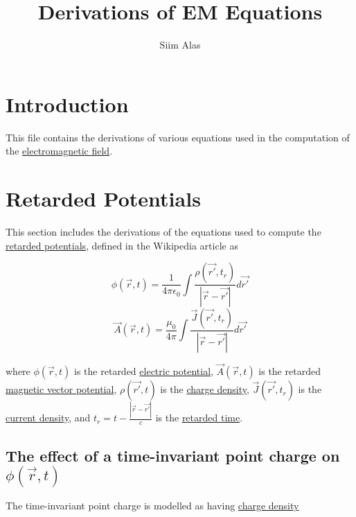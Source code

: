 ﻿\documentclass{article}
\title{Derivations of EM Equations}
\author{Siim Alas}
\begin{document}
\maketitle

\section*{Introduction}

This file contains the derivations of various equations used in the computation of the \href{https://en.wikipedia.org/wiki/Electromagnetic_field}{electromagnetic field}.

\section{Retarded Potentials}

This section includes the derivations of the equations used to compute the \href{https://en.wikipedia.org/wiki/Retarded_potential}{retarded potentials}, defined in the Wikipedia article as

\begin{equation}
    \label{eq:definitionOfPhi}
    \phi(\vec{r}, t) = \frac{1}{4 \pi \epsilon_0} \int \frac{\rho(\vec{r'}, t_r)}{|\vec{r} - \vec{r'}|} d \vec{r'}
\end{equation}
\begin{equation}
    \label{eq:definitionOfA}
    \vec{A}(\vec{r}, t) = \frac{\mu_0}{4 \pi} \int \frac{\vec{J}(\vec{r'}, t_r)}{|\vec{r} - \vec{r'}|} d \vec{r'}
\end{equation}

where $\phi(\vec{r}, t)$ is the retarded \href{https://en.wikipedia.org/wiki/Electric_potential}{electric potential}, $\vec{A}(\vec{r}, t)$ is the retarded \href{https://en.wikipedia.org/wiki/Magnetic_vector_potential}{magnetic vector potential}, $\rho(\vec{r'}, t)$ is the \href{https://en.wikipedia.org/wiki/Charge_density}{charge density}, $\vec{J}(\vec{r'}, t_r)$ is the \href{https://en.wikipedia.org/wiki/Current_density}{current density}, and $t_r = t - \frac{|\vec{r} - \vec{r'}|}{c}$ is the \href{https://en.wikipedia.org/wiki/Retarded_time}{retarded time}.

\subsection{The effect of a time-invariant point charge on $\phi(\vec{r}, t)$}

The time-invariant point charge is modelled as having \href{https://en.wikipedia.org/wiki/Charge_density}{charge density}
\end{document}
